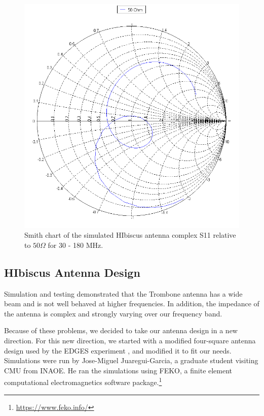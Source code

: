 \begin{figure}[htb]
\begin{minipage}[b]{0.46\textwidth}
\includegraphics[width=0.95\linewidth]{SCIHI_system/figures/HIbiscus_S11_50_Smith.png}
\caption{Smith chart of the simulated HIbiscus antenna complex S11 relative to $50 \Omega$ for 30 - 180 MHz.}
\label{Fig:HIsim_S11_Smith}
\end{minipage}
\end{figure}


\subsection{HIbiscus Antenna Design}

Simulation and testing demonstrated that the Trombone antenna has a wide beam and is not well behaved at higher frequencies. In addition, the impedance of the antenna is complex and strongly varying over our frequency band. 

Because of these problems, we decided to take our antenna design in a new direction. For this new direction, we started with a modified four-square antenna design used by the EDGES experiment \cite{bowman_2008}\cite{rogers_2008}, and modified it to fit our needs. Simulations were run by Jose-Miguel Juaregui-Garcia, a graduate student visiting CMU from INAOE. He ran the simulations using FEKO, a finite element computational electromagnetics software package.\footnote{\url{https://www.feko.info/}} 

